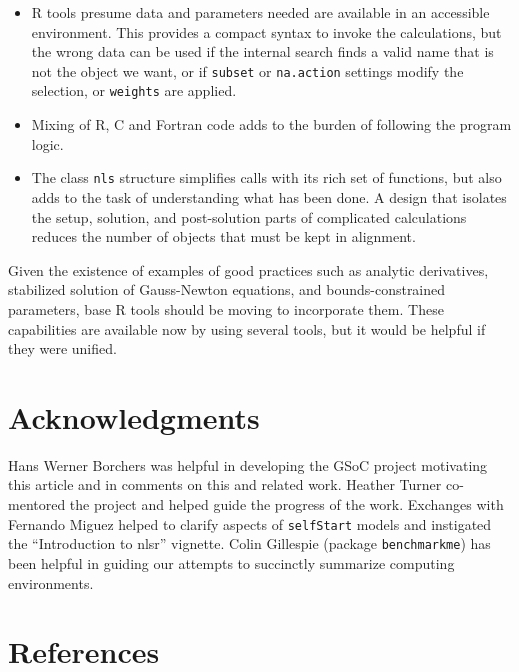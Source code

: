 \begin{itemize}
\item
  R tools presume data and parameters needed are available in an
  accessible environment. This provides a compact syntax to invoke the
  calculations, but the wrong data can be used if the
  internal search finds a valid name that is not the object we want,
  or if \texttt{subset} or \texttt{na.action} settings modify the selection, or
  \texttt{weights} are applied.
\item
  Mixing of R, C and Fortran code adds to the burden of following the
  program logic.
\item
  The class \texttt{nls} structure simplifies calls with its rich set of functions, but
  also adds to the task of understanding what has been done. A design that isolates
  the setup, solution, and post-solution parts of complicated calculations reduces
  the number of objects that must be kept in alignment.
\end{itemize}

Given the existence of examples of good practices such as analytic derivatives,
stabilized solution of Gauss-Newton equations, and bounds-constrained parameters,
base R tools should
be moving to incorporate them. These capabilities are available now by
using several tools, but it would be helpful if they were unified.

\section{Acknowledgments}\label{acknowledgments}

Hans Werner Borchers was helpful in developing the GSoC project motivating this article
and in comments on this and related work. Heather Turner co-mentored the project
and helped guide the progress of the work. Exchanges with Fernando Miguez helped to
clarify aspects of \texttt{selfStart} models and instigated the ``Introduction to nlsr''
vignette. Colin Gillespie (package \texttt{benchmarkme}) has been helpful in guiding our
attempts to succinctly summarize computing environments.

\section*{References}\label{references}

